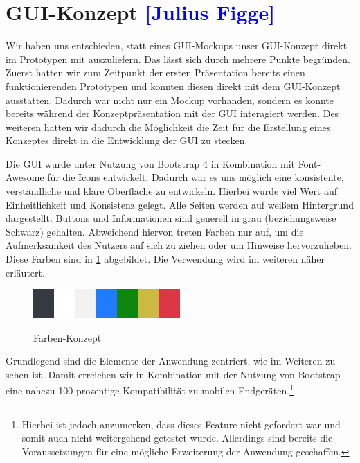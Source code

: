 

\section{GUI-Konzept \textcolor{blue}{[Julius Figge]}}

Wir haben uns entschieden, statt eines GUI-Mockups unser GUI-Konzept direkt im Prototypen mit auszuliefern.
Das lässt sich durch mehrere Punkte begründen.
Zuerst hatten wir zum Zeitpunkt der ersten Präsentation bereits einen funktionierenden Prototypen und konnten diesen direkt mit dem GUI-Konzept ausstatten. Dadurch war nicht nur ein Mockup vorhanden, sondern es konnte bereits während der Konzeptpräsentation mit der GUI interagiert werden.
Des weiteren hatten wir dadurch die Möglichkeit die Zeit für die Erstellung eines Konzeptes direkt in die Entwicklung der GUI zu stecken.

Die GUI wurde unter Nutzung von Bootstrap 4 in Kombination mit Font-Awesome für die Icons entwickelt.
Dadurch war es uns möglich eine konsistente, verständliche und klare Oberfläche zu entwickeln.
Hierbei wurde viel Wert auf Einheitlichkeit und Konsistenz gelegt. Alle Seiten werden auf weißem Hintergrund dargestellt. Buttons und Informationen sind generell in grau (beziehungsweise Schwarz) gehalten.
Abweichend hiervon treten Farben nur auf, um die Aufmerksamkeit des Nutzers auf sich zu ziehen oder um Hinweise hervorzuheben. Diese Farben sind in \cref{fig:farbmuster} abgebildet. Die Verwendung wird im weiteren näher erläutert.

\begin{figure}[h!!]
    \centering
    \begin{minipage}[t]{1\textwidth}
        \caption{Farben-Konzept}
        \includegraphics[width=0.5\textwidth]{img/Farbmuster.png}\\
        \label{fig:farbmuster}
    \end{minipage}
\end{figure}


Grundlegend sind die Elemente der Anwendung zentriert, wie im Weiteren zu sehen ist. Damit erreichen wir in Kombination mit der Nutzung von Bootstrap eine nahezu 100-prozentige Kompatibilität zu mobilen Endgeräten.\footnote{Hierbei ist jedoch anzumerken, dass dieses Feature nicht gefordert war und somit auch nicht weitergehend getestet wurde. Allerdings sind bereits die Voraussetzungen für eine mögliche Erweiterung der Anwendung geschaffen.}

